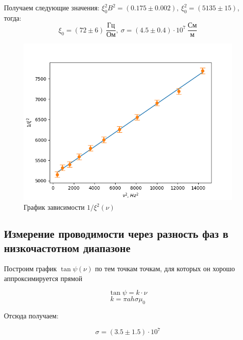 \documentclass[a4paper]{article}
\begin{document}
Получаем следующие значения: $\xi_0^2B^2 = (0.175 \pm 0.002), \ \xi_0^2 = (5135 \pm 15)$, тогда:
\[\xi_0 = (72 \pm 6) \ \frac{\text{Гц}}{\text{Ом}}, \ \sigma = (4.5 \pm 0.4) \cdot 10^7 \ \frac{\text{См}}{\text{м}}  \]

\begin{figure}[h!]
    \centering
    \includegraphics[width=0.6\pdfpagewidth]{graph1.png}
    \caption{График зависимости $1/\xi^2(\nu)$}
\end{figure}

\newpage

\subsection{Измерение проводимости через разность фаз в низкочастотном диапазоне}

Построим график $\tan{\psi}(\nu)$ по тем точкам точкам, для которых он хорошо аппроксимируется прямой

\begin{equation*}
    \tan{\psi} = k \cdot \nu 
\end{equation*}
\begin{equation*}
    k = \pi a h \sigma \mu_0
\end{equation*}

Отсюда получаем:

\begin{equation*}
    \sigma = (3.5 \pm 1.5) \cdot 10^7
\end{equation*}
\end{document}
